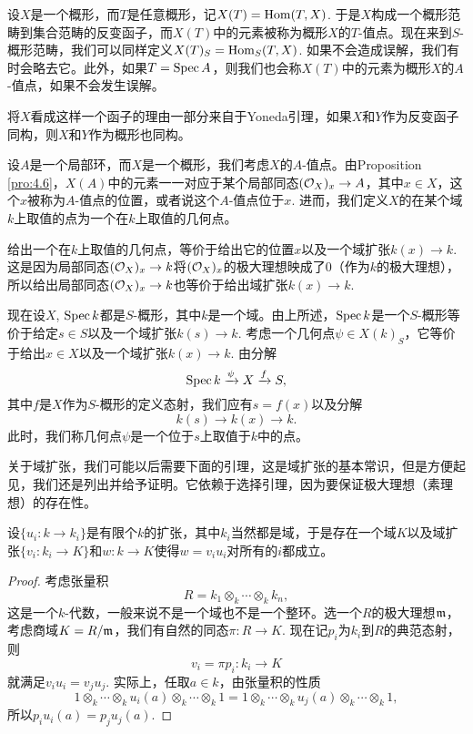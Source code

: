 \begin{para}[$T$-值点]
设$X$是一个概形，而$T$是任意概形，记$X(T)=\operatorname{Hom}(T,X)$. 于是$X$构成一个概形范畴到集合范畴的反变函子，而$X(T)$中的元素被称为概形$X$的$T$-值点。现在来到$S$-概形范畴，我们可以同样定义$X(T)_S=\operatorname{Hom}_S(T,X)$. 如果不会造成误解，我们有时会略去它。此外，如果$T=\operatorname{Spec} A$，则我们也会称$X(T)$中的元素为概形$X$的$A$-值点，如果不会发生误解。

将$X$看成这样一个函子的理由一部分来自于Yoneda引理，如果$X$和$Y$作为反变函子同构，则$X$和$Y$作为概形也同构。
\end{para}

\begin{para}[几何点]
设$A$是一个局部环，而$X$是一个概形，我们考虑$X$的$A$-值点。由Proposition \ref{pro:4.6}，$X(A)$中的元素一一对应于某个局部同态$(\mathcal{O}_X)_x\to A$，其中$x\in X$，这个$x$被称为$A$-值点的位置，或者说这个$A$-值点位于$x$. 进而，我们定义$X$的在某个域$k$上取值的点为一个在$k$上取值的几何点。

给出一个在$k$上取值的几何点，等价于给出它的位置$x$以及一个域扩张$k(x)\to k$. 这是因为局部同态$(\mathcal{O}_X)_x\to k$将$(\mathcal{O}_X)_x$的极大理想映成了$0$（作为$k$的极大理想），所以给出局部同态$(\mathcal{O}_X)_x\to k$也等价于给出域扩张$k(x)\to k$. 

现在设$X$, $\operatorname{Spec} k$都是$S$-概形，其中$k$是一个域。由上所述，$\operatorname{Spec} k$是一个$S$-概形等价于给定$s\in S$以及一个域扩张$k(s)\to k$. 考虑一个几何点$\psi\in X(k)_S$，它等价于给出$x\in X$以及一个域扩张$k(x)\to k$. 由分解
\[
	\operatorname{Spec} k \xrightarrow{\psi} X\xrightarrow{f} S,
\]
其中$f$是$X$作为$S$-概形的定义态射，我们应有$s=f(x)$以及分解
\[
	k(s)\to k(x)\to k.
\]
此时，我们称几何点$\psi$是一个位于$s$上取值于$k$中的点。
\end{para}

关于域扩张，我们可能以后需要下面的引理，这是域扩张的基本常识，但是方便起见，我们还是列出并给予证明。它依赖于选择引理，因为要保证极大理想（素理想）的存在性。

\begin{lem}\label{composite_ext}
设$\{u_i:k\to k_i\}$是有限个$k$的扩张，其中$k_i$当然都是域，于是存在一个域$K$以及域扩张$\{v_i:k_i\to K\}$和$w:k\to K$使得$w=v_iu_i$对所有的$i$都成立。
\end{lem}

\begin{proof}
考虑张量积
\[
	R=k_1\otimes_k \cdots \otimes_k k_n,
\]
这是一个$k$-代数，一般来说不是一个域也不是一个整环。选一个$R$的极大理想$\mathfrak{m}$，考虑商域$K=R/\mathfrak{m}$，我们有自然的同态$\pi:R\to K$. 现在记$p_i$为$k_i$到$R$的典范态射，则
\[
	v_i=\pi p_i:k_i\to K
\]
就满足$v_iu_i=v_ju_j$. 实际上，任取$a\in k$，由张量积的性质
\[
	1\otimes_k \cdots\otimes_k u_i(a)\otimes_k \cdots\otimes_k 1=1\otimes_k \cdots\otimes_k u_j(a)\otimes_k \cdots\otimes_k 1,
\]
所以$p_iu_i(a)=p_ju_j(a)$. 
\end{proof}

